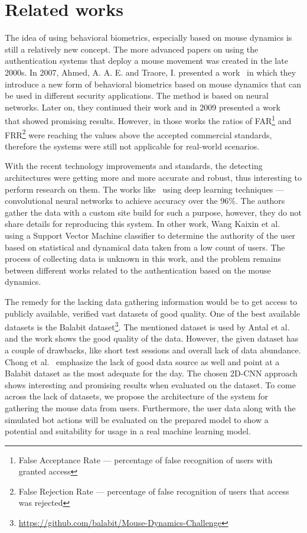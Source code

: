 \section{Related works}\label{sec:related-works}
The idea of using behavioral biometrics, especially based on mouse dynamics is still a relatively new concept.
The more advanced papers on using the authentication systems that deploy a mouse movement was created in the late 2000s.
In 2007, Ahmed, A. A. E. and Traore, I. presented a work~\cite{firstMouseBBPapers1} in which they introduce a new form of behavioral biometrics based on mouse dynamics that can be used in different security applications.
The method is based on neural networks.
Later on, they continued their work and in 2009 presented a work~\cite{wang2009behavioral} that showed promising results.
However, in those works the ratios of FAR\footnote{False Acceptance Rate --- percentage of false recognition of users with granted access} and FRR\footnote{False Rejection Rate --- percentage of false recognition of users that access was rejected} were reaching the values above the accepted commercial standards, therefore the systems were still not applicable for real-world scenarios.

With the recent technology improvements and standards, the detecting architectures were getting more and more accurate and robust, thus interesting to perform research on them.
The works like~\cite{a-deep-learning-approach-to-web-bot-detection-using-mouse-behavioral-biometrics} using deep learning techniques --- convolutional neural networks to achieve accuracy over the 96\%.
The authors gather the data with a custom site build for such a purpose, however, they do not share details for reproducing this system.
In other work, Wang Kaixin et al.~\cite{a-user-authentication-and-identification-model-based-on-mouse-dynamics} using a Support Vector Machine classifier to determine the authority of the user based on statistical and dynamical data taken from a low count of users.
The process of collecting data is unknown in this work, and the problem remains between different works related to the authentication based on the mouse dynamics.

The remedy for the lacking data gathering information would be to get access to publicly available, verified vast datasets of good quality.
One of the best available datasets is the Balabit dataset\footnote{\url{https://github.com/balabit/Mouse-Dynamics-Challenge}}.
The mentioned dataset is used by Antal et al.~\cite{antal2019intrusion} and the work shows the good quality of the data.
However, the given dataset has a couple of drawbacks, like short test sessions and overall lack of data abundance.
Chong et al.~\cite{Main} emphasize the lack of good data source as well and point at a Balabit dataset as the most adequate for the day.
The chosen 2D-CNN approach shows interesting and promising results when evaluated on the dataset.
To come across the lack of datasets, we propose the architecture of the system for gathering the mouse data from users.
Furthermore, the user data along with the simulated bot actions will be evaluated on the prepared model to show a potential and suitability for usage in a real machine learning model.
